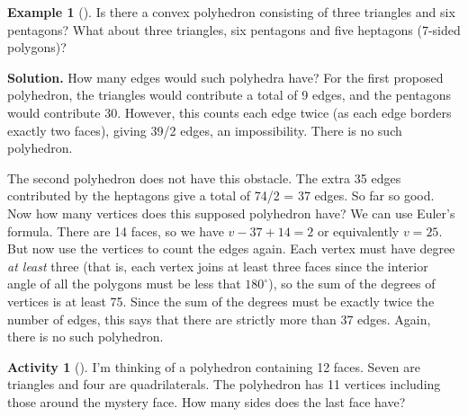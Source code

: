 \documentclass[10pt,]{book}
\theoremstyle{plain}
\theoremstyle{definition}
\theoremstyle{definition}
\newtheorem{example}[theorem]{Example}
\theoremstyle{definition}
\newtheorem{activity}[project]{Activity}
\numberwithin{equation}{chapter}
\begin{document}
\begin{example}[]\label{example-8}
\hypertarget{p-303}{}%
Is there a convex polyhedron consisting of three triangles and six pentagons? What about three triangles, six pentagons and five heptagons (7-sided polygons)?%
\par\smallskip%
\noindent\textbf{Solution.}\hypertarget{solution-16}{}\quad%
\hypertarget{p-304}{}%
How many edges would such polyhedra have? For the first proposed polyhedron, the triangles would contribute a total of 9 edges, and the pentagons would contribute 30. However, this counts each edge twice (as each edge borders exactly two faces), giving 39/2 edges, an impossibility. There is no such polyhedron.%
\par
\hypertarget{p-305}{}%
The second polyhedron does not have this obstacle. The extra 35 edges contributed by the heptagons give a total of 74/2 = 37 edges. So far so good. Now how many vertices does this supposed polyhedron have? We can use Euler's formula. There are 14 faces, so we have \(v - 37 + 14 = 2\) or equivalently \(v = 25\). But now use the vertices to count the edges again. Each vertex must have degree \emph{at least} three (that is, each vertex joins at least three faces since the interior angle of all the polygons must be less that \(180^\circ\)), so the sum of the degrees of vertices is at least 75. Since the sum of the degrees must be exactly twice the number of edges, this says that there are strictly more than 37 edges. Again, there is no such polyhedron.%
\end{example}
\begin{activity}[]\label{activity-28}
\hypertarget{p-306}{}%
I'm thinking of a polyhedron containing 12 faces. Seven are triangles and four are quadrilaterals. The polyhedron has 11 vertices including those around the mystery face. How many sides does the last face have?%
\end{activity}
\end{document}
